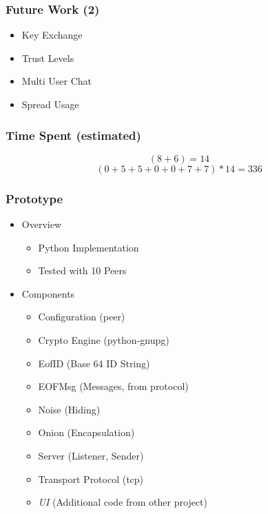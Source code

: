 \documentclass{beamer}
\begin{document}
\frame
{
  \frametitle{Future Work (2)}
  \begin{itemize}
    \item Key Exchange
    \item Trust Levels
    \item Multi User Chat
    \item Spread Usage
  \end{itemize}
}

\frame
{
  \frametitle{Time Spent (estimated)}
    $$(8+6) = 14$$
    $$(0+5+5+0+0+7+7)*14 = 336$$
}

\frame
{
  \frametitle{Prototype}
  \begin{itemize}
     \item Overview
      \begin{itemize}
          \item Python Implementation
          \item Tested with 10 Peers
      \end{itemize}
      \item Components
      \begin{itemize}
          \item Configuration (peer)
          \item Crypto Engine (python-gnupg)
          \item EofID (Base 64 ID String)
          \item EOFMsg (Messages, from protocol)
          \item Noise (Hiding)
          \item Onion (Encapsulation)
          \item Server (Listener, Sender)
          \item Transport Protocol (tcp)
          \item \textit{UI} (Additional code from other project)
      \end{itemize}
   \end{itemize}
}
\end{document}

